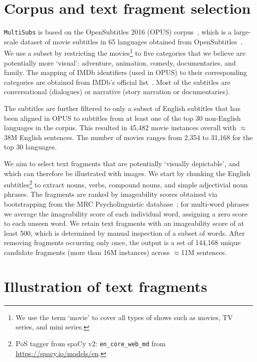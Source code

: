 \documentclass[twocolumn]{svjour3}          \smartqed  \usepackage{graphicx}
\newcommand{\multisubs}{\texttt{MultiSubs}\xspace}
\begin{document}
\section{Corpus and text fragment selection}
\label{sec:subtitles}

\multisubs is based on the OpenSubtitles 2016 (OPUS) corpus~\cite{LisonTiedemann:2016}, which is a large-scale dataset of movie subtitles in 65 languages obtained from OpenSubtitles~\cite{Opensubtitles:2019}. We use a subset by restricting the movies\footnote{We use the term `movie' to cover all types of shows such as movies, TV series, and mini series.} 
to five categories that we believe are potentially more `visual': adventure, animation, comedy, documentaries, and family. The mapping of IMDb identifiers (used in OPUS) to their corresponding categories are obtained from IMDb's official list~\cite{IMDb:2019}. Most of the subtitles are conversational (dialogues) or narrative (story narration or documentaries). 

The subtitles are further filtered to only a subset of English subtitles that has been aligned in OPUS to subtitles from at least one of the top 30 non-English languages in the corpus. This resulted in 45,482 movie instances overall with $\approx$38M English sentences. The number of movies ranges from 2,354 to 31,168 for the top 30 languages.



We aim to select text fragments that are potentially `visually depictable', and which can therefore be illustrated with images. We start by chunking the English subtitles\footnote{PoS tagger from spaCy v2: \texttt{en\_core\_web\_md} from \url{https://spacy.io/models/en}.} to extract nouns, verbs, compound nouns, and simple adjectivial noun phrases. The fragments are ranked by imageability scores obtained via bootstrapping from the MRC Psycholinguistic database~\cite{PaetzoldSpecia:2016}; for multi-word phrases we average the imageability score of each individual word, assigning a zero score to each unseen word. We retain text fragments with an imageability score of at least 500, which is determined by manual inspection of a subset of words. After removing fragments occurring only once, the output is a set of 144,168 unique candidate fragments (more than 16M instances) across $\approx$11M sentences. 

\section{Illustration of text fragments}
\label{sec:phrase-illustration}
\end{document}
